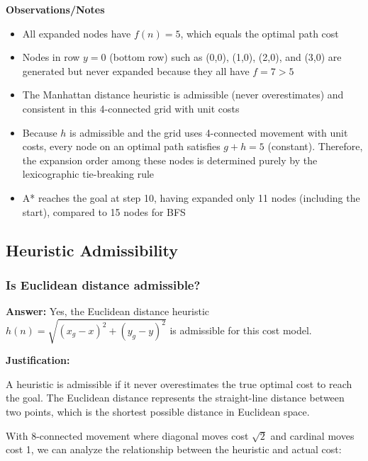 \documentclass[11pt]{article}
\begin{document}
\textbf{Observations/Notes}

\begin{itemize}
    \item All expanded nodes have $f(n) = 5$, which equals the optimal path cost
    \item Nodes in row $y=0$ (bottom row) such as (0,0), (1,0), (2,0), and (3,0) are generated but never expanded because they all have $f = 7 > 5$
    \item The Manhattan distance heuristic is admissible (never overestimates) and consistent in this 4-connected grid with unit costs
    \item Because $h$ is admissible and the grid uses 4-connected movement with unit costs, every node on an optimal path satisfies $g + h = 5$ (constant). Therefore, the expansion order among these nodes is determined purely by the lexicographic tie-breaking rule
    \item A* reaches the goal at step 10, having expanded only 11 nodes (including the start), compared to 15 nodes for BFS
\end{itemize}

\subsection{Heuristic Admissibility}

\subsubsection{Is Euclidean distance admissible?}

\textbf{Answer:} Yes, the Euclidean distance heuristic $h(n) = \sqrt{(x_g - x)^2 + (y_g - y)^2}$ is admissible for this cost model.

\textbf{Justification:}

A heuristic is admissible if it never overestimates the true optimal cost to reach the goal. The Euclidean distance represents the straight-line distance between two points, which is the shortest possible distance in Euclidean space.

With 8-connected movement where diagonal moves cost $\sqrt{2}$ and cardinal moves cost 1, we can analyze the relationship between the heuristic and actual cost:
\end{document}

